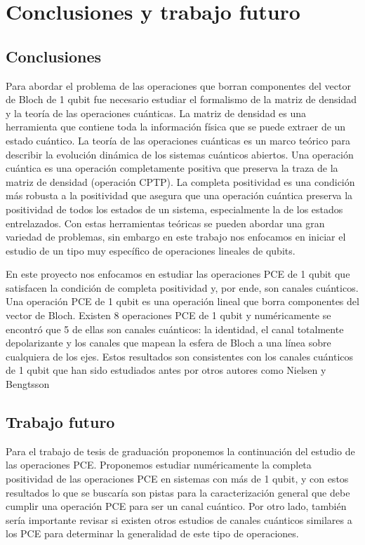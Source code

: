 \chapter{Conclusiones y trabajo futuro}
\section{Conclusiones}

Para abordar el problema de las operaciones que borran componentes 
del vector de Bloch de 1 qubit fue necesario estudiar el formalismo de 
la matriz de densidad y la teoría de las operaciones cuánticas. 
La matriz de densidad es una herramienta que contiene toda la información 
física que se puede extraer de un estado cuántico. La teoría de las 
operaciones cuánticas es un marco teórico para describir 
la evolución dinámica de los sistemas cuánticos abiertos. 
Una operación cuántica es una operación completamente positiva 
que preserva la traza de la matriz de densidad (operación CPTP).
La completa positividad es una condición más robusta a la positividad 
que asegura que una operación cuántica preserva la positividad de todos 
los estados de un sistema, especialmente la de los estados entrelazados.
Con estas herramientas teóricas se pueden abordar una gran variedad
de problemas, sin embargo en este trabajo nos enfocamos en iniciar el 
estudio de un tipo muy específico de operaciones lineales de qubits.

En este proyecto nos enfocamos en estudiar las operaciones PCE 
de 1 qubit que satisfacen la condición de completa positividad
y, por ende, son canales cuánticos. Una operación PCE 
de 1 qubit es una operación lineal que borra componentes del 
vector de Bloch. Existen 8 operaciones PCE de 1 qubit y 
numéricamente se encontró que 5 de ellas son 
canales cuánticos: la identidad, el canal totalmente depolarizante 
y los canales que mapean la esfera de Bloch a una línea sobre 
cualquiera de los ejes. Estos resultados son consistentes 
con los canales cuánticos de 1 qubit que han sido estudiados antes 
por otros autores como Nielsen y Bengtsson 
\cite{bengtsson_zyczkowski_2017,nielsen_chuang_2011}

\section{Trabajo futuro}
Para el trabajo de tesis de graduación proponemos la continuación del
estudio de las operaciones PCE. Proponemos estudiar numéricamente 
la completa positividad de las operaciones PCE en sistemas con 
más de 1 qubit, y con estos resultados lo que se buscaría son pistas 
para la caracterización general que debe cumplir una operación 
PCE para ser un canal cuántico. Por otro lado, también sería importante
revisar si existen otros estudios de canales cuánticos similares a los 
PCE para determinar la generalidad de este tipo de operaciones.
